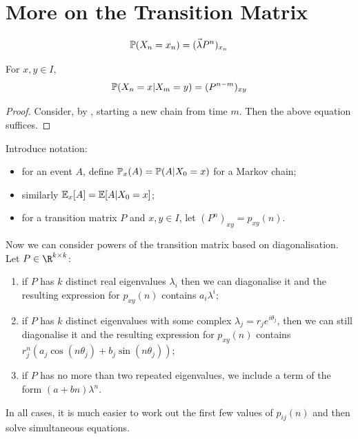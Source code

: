 \documentclass[../Main.tex]{subfiles}
\begin{document}
\section{More on the Transition Matrix}
\begin{equation*}
    \P(X_n = x_n) = (\vec{\lambda} P^n)_{x_n}
\end{equation*}
\begin{proposition}
    For $x, y \in I$,
    \begin{equation*}
        \P(X_n = x | X_m = y) = (P^{n-m})_{xy}
    \end{equation*}
    \label{propMarkovGeneralPath}
\end{proposition}
\begin{proof}
    Consider, by , starting a new chain from time $m$. Then the above equation suffices.
\end{proof}
Introduce notation:
\begin{itemize}
    \item for an event $A$, define $\P_x(A) = \P(A | X_0 = x)$ for a Markov chain;
    \item similarly $\E_x[A] = \E[A | X_0 = x]$;
    \item for a transition matrix $P$ and $x, y \in I$, let $(P^n)_{xy} = p_{xy}(n)$.
\end{itemize}
Now we can consider powers of the transition matrix based on diagonalisation. Let $P \in\R^{k \times k}$:
\begin{enumerate}
    \item if $P$ has $k$ distinct real eigenvalues $\lambda_i$ then we can diagonalise it and the resulting expression for $p_{xy}(n)$ contains $a_i\lambda^i$;
    \item if $P$ has $k$ distinct eigenvalues with some complex $\lambda_j = r_j e^{i\theta_j}$, then we can still diagonalise it and the resulting expression for $p_{xy}(n)$ contains $r_j^n \left(a_j\cos(n\theta_j) + b_j\sin(n\theta_j)\right)$;
    \item if $P$ has no more than two repeated eigenvalues, we include a term of the form $(a + bn)\lambda^n$.
\end{enumerate}
In all cases, it is much easier to work out the first few values of $p_{ij}(n)$ and then solve simultaneous equations.
\end{document}

